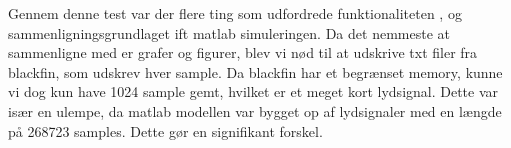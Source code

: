 Gennem denne test var der flere ting som udfordrede funktionaliteten , og sammenligningsgrundlaget ift matlab simuleringen. 
Da det nemmeste at sammenligne med er grafer og figurer, blev vi nød til at udskrive txt filer fra blackfin, som udskrev hver sample. Da blackfin har et begrænset memory, kunne vi dog kun have 1024 sample gemt, hvilket er et meget kort lydsignal. Dette var især en ulempe, da matlab modellen var bygget op af lydsignaler med en længde på 268723 samples. Dette gør en signifikant forskel. 
